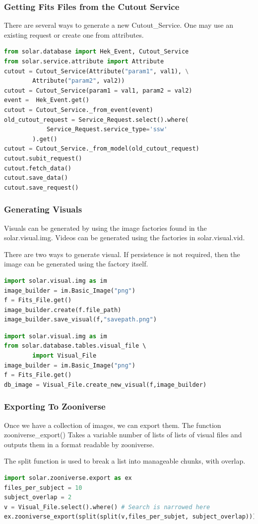 \documentclass{beamer}
\begin{document}
\begin{frame}[fragile]
    \frametitle{Getting Fits Files from the Cutout Service}
There are several ways to generate a new Cutout\_Service. One may use an existing request or create one from attributes.

    \begin{lstlisting}[language=Python]
from solar.database import Hek_Event, Cutout_Service
from solar.service.attribute import Attribute
cutout = Cutout_Service(Attribute("param1", val1), \
        Attribute("param2", val2))
cutout = Cutout_Service(param1 = val1, param2 = val2)
event =  Hek_Event.get()
cutout = Cutout_Service._from_event(event)
old_cutout_request = Service_Request.select().where(
            Service_Request.service_type='ssw'
        ).get()
cutout = Cutout_Service._from_model(old_cutout_request)
cutout.subit_request()
cutout.fetch_data()
cutout.save_data()
cutout.save_request()
    \end{lstlisting}

\end{frame}

\begin{frame}[fragile]
    \frametitle{Generating Visuals}
Visuals can be generated by using the image factories found in the solar.visual.img. Videos can be generated using the factories in solar.visual.vid.

There are two ways to generate visual. If persistence is not required, then the image can be generated using the factory itself.

\begin{lstlisting}[language=Python]
import solar.visual.img as im
image_builder = im.Basic_Image("png")
f = Fits_File.get()
image_builder.create(f.file_path)
image_builder.save_visual(f,"savepath.png")    
\end{lstlisting}
\vspace{-0.8cm}
\begin{lstlisting}[language=Python]
import solar.visual.img as im
from solar.database.tables.visual_file \ 
        import Visual_File
image_builder = im.Basic_Image("png")
f = Fits_File.get()
db_image = Visual_File.create_new_visual(f,image_builder)
\end{lstlisting}
\end{frame}

\begin{frame}[fragile]
    \frametitle{Exporting To Zooniverse}
Once we have a collection of images, we can export them. The function zooniverse\_export() Takes a variable number of lists of lists of visual files and outputs them in a format readable by zooniverse.

The split function is used to break a list into manageable chunks, with overlap.
\begin{lstlisting}[language=Python]
import solar.zooniverse.export as ex
files_per_subject = 10
subject_overlap = 2
v = Visual_File.select().where() # Search is narrowed here
ex.zooniverse_export(split(split(v,files_per_subjet, subject_overlap)))
\end{lstlisting}
\end{frame}
\end{document}
